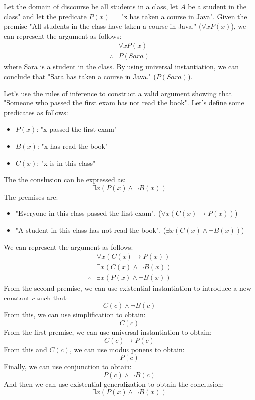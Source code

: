 \begin{eg}
    Let the domain of discourse be all students in a class, let $A$ be a student in the class" and let the predicate $P(x) =$ "x has taken a course in Java". Given the premise "All students in the class have taken a course in Java." ($\forall x P(x)$), we can represent the argument as follows:
    \[
        \begin{array}{rl}
            & \forall x P(x) \\
            \hline
            \therefore & P(Sara)
        \end{array}
    \]
    where Sara is a student in the class. By using universal instantiation, we can conclude that "Sara has taken a course in Java." ($P(Sara)$).
\end{eg}

\begin{eg}
    Let's use the rules of inference to construct a valid argument showing that "Someone who passed the first exam has not read the book". Let's define some predicates as follows:
    \begin{itemize}[itemsep=1pt,label=$\circ$]
        \item $P(x)$: "x passed the first exam"
        \item $B(x)$: "x has read the book"
        \item $C(x)$: "x is in this class"
    \end{itemize}
    The the conslusion can be expressed as:
    \[
        \exists x (P(x) \land \neg B(x))
    \]
    The premises are:
    \begin{itemize}[itemsep=1pt,label=$\circ$]
        \item "Everyone in this class passed the first exam". ($\forall x (C(x) \to P(x))$)
        \item "A student in this class has not read the book". ($\exists x (C(x) \land \neg B(x))$)
    \end{itemize}
    We can represent the argument as follows:
    \[
        \begin{array}{rl}
            & \forall x (C(x) \to P(x)) \\
            & \exists x (C(x) \land \neg B(x)) \\
            \hline
            \therefore & \exists x (P(x) \land \neg B(x))
        \end{array}
    \]
    From the second premise, we can use existential instantiation to introduce a new constant $c$ such that:
    \[
        C(c) \land \neg B(c)
    \]
    From this, we can use simplification to obtain:
    \[
        C(c)
    \]
    From the first premise, we can use universal instantiation to obtain:
    \[
        C(c) \to P(c)
    \]
    From this and $C(c)$, we can use modus ponens to obtain:
    \[
        P(c)
    \]
    Finally, we can use conjunction to obtain:
    \[
        P(c) \land \neg B(c)
    \]
    And then we can use existential generalization to obtain the conclusion:
    \[
        \exists x (P(x) \land \neg B(x))
    \]
\end{eg}

